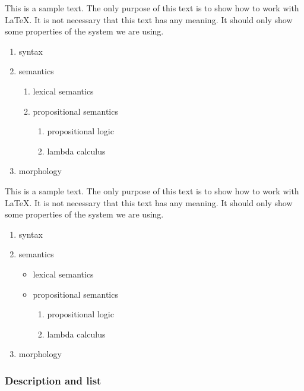 \documentclass[10pt, paper=a4, abstracton]{scrartcl}
\begin{document}
This is a sample text. The only purpose of this text is to show how to work with \LaTeX . It is not necessary that this text has any meaning. It should only show some properties of the system we are using.

\begin{enumerate}
	\item syntax
	\item semantics 
	
	\begin{enumerate}
		\item lexical semantics
		\item propositional semantics
		
		\begin{enumerate}
			\item propositional logic
			\item lambda calculus
		\end{enumerate}
	\end{enumerate}
	
	\item morphology
\end{enumerate}


This is a sample text. The only purpose of this text is to show how to work with \LaTeX . It is not necessary that this text has any meaning. It should only show some properties of the system we are using.

\begin{enumerate}
	\item syntax
	\item semantics 
	
	\begin{itemize}
		\item lexical semantics
		\item propositional semantics
		
		\begin{enumerate}
			\item propositional logic
			\item lambda calculus
		\end{enumerate}
	\end{itemize}
	
	\item morphology
\end{enumerate}


\subsubsection{Description and list}
\end{document}
